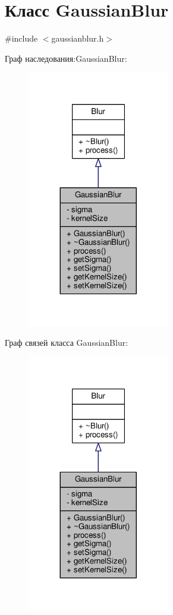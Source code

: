 \hypertarget{class_gaussian_blur}{}\section{Класс Gaussian\+Blur}
\label{class_gaussian_blur}


{\ttfamily \#include $<$gaussianblur.\+h$>$}



Граф наследования\+:Gaussian\+Blur\+:
\nopagebreak
\begin{figure}[H]
\begin{center}
\leavevmode
\includegraphics[width=176pt]{d4/d1f/class_gaussian_blur__inherit__graph}
\end{center}
\end{figure}


Граф связей класса Gaussian\+Blur\+:
\nopagebreak
\begin{figure}[H]
\begin{center}
\leavevmode
\includegraphics[width=176pt]{d0/df8/class_gaussian_blur__coll__graph}
\end{center}
\end{figure}
